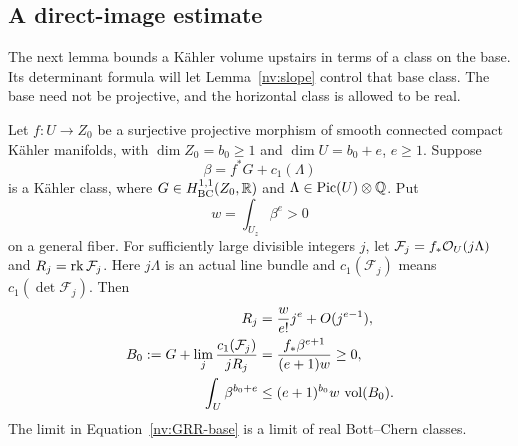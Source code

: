 \subsection{A direct-image estimate}

The next lemma bounds a Kähler volume upstairs in terms of a class on the
base.  Its determinant formula will let Lemma~\ref{nv:slope} control that
base class.  The base need not be projective, and the horizontal class is
allowed to be real.

\begin{lemma}\label{nv:direct-image}
Let \(f:U\to Z_0\) be a surjective projective morphism of smooth connected
compact Kähler manifolds, with
\(\dim Z_0=b_0\ge1\) and \(\dim U=b_0+e\), \(e\ge1\).  Suppose
\[
 \beta=f^*G+c_1(\Lambda)
\]
is a Kähler class, where \(G\in H^{1,1}_{\mathrm{BC}}(Z_0,\mathbb R)\) and
\(\Lambda\in\operatorname{Pic}(U)\otimes\mathbb Q\).  Put
\[
 w=\int_{U_z}\beta^e>0
\]
on a general fiber.  For sufficiently large divisible integers \(j\),
let \(\mathcal F_j=f_*\mathcal O_U(j\Lambda)\) and \(R_j=\operatorname{rk}\mathcal F_j\).
Here \(j\Lambda\) is an actual line bundle and
\(c_1(\mathcal F_j)\) means \(c_1(\det\mathcal F_j)\).  Then
\begin{align}
 R_j&=\frac{w}{e!}j^e+O(j^{e-1}),\label{nv:GRR-rank}\\
 B_0:=G+\lim_j\frac{c_1(\mathcal F_j)}{jR_j}
 &=\frac{f_*\beta^{e+1}}{(e+1)w}\ge0,\label{nv:GRR-base}\\
 \int_U\beta^{b_0+e}
 &\le (e+1)^{b_0}w\,\operatorname{vol}(B_0).\label{nv:mixed-bound}
\end{align}
The limit in Equation~\eqref{nv:GRR-base} is a limit of real Bott--Chern classes.
\end{lemma}

